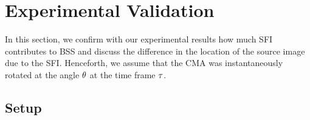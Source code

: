 \documentclass[sip,biber]{now-journal}
\begin{document}
\section{Experimental Validation}\label{sec:experiment}
In this section, we confirm with our experimental results how much SFI contributes to BSS and discuss the difference in the location of the source image due to the SFI.
Henceforth, we assume that the CMA was instantaneously rotated at the angle $\theta$ at the time frame $\tau$.

\subsection{Setup}
\end{document}
